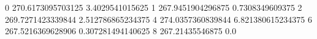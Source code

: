 0 270.6173095703125 3.4029541015625
1 267.9451904296875 0.7308349609375
2 269.7271423339844 2.512786865234375
4 274.0357360839844 6.821380615234375
6 267.5216369628906 0.307281494140625
8 267.21435546875 0.0
